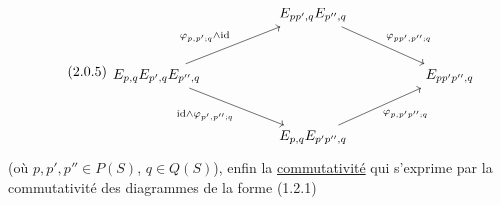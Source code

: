 \begin{equation}\tag{2.0.5}
\begin{tikzcd}[column sep=huge, row sep=large]
 & E_{pp',q}E_{p'',q} \arrow[rd, "{\varphi_{pp',p'';q}}"] & \\
E_{p,q}E_{p',q}E_{p'',q} \arrow[ru, "{\varphi_{p,p';q}\wedge \mathrm{id}}"] \arrow[rd, "{\mathrm{id}\wedge\varphi_{p',p'';q}}"'] & & E_{pp'p'',q} \\
 & E_{p,q}E_{p'p'',q} \arrow[ru, "{\varphi_{p,p'p'';q}}"'] &
\end{tikzcd}
\end{equation}
(où $p,p',p'' \in P(S)$, $q \in Q(S)$), enfin la \underline{commutativité} qui s'exprime par la commutativité des diagrammes de la forme (1.2.1) 



